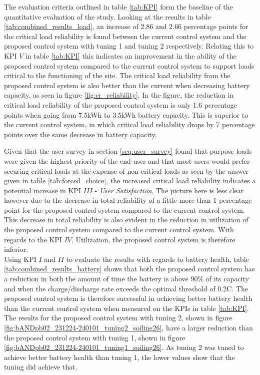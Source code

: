 The evaluation criteria outlined in table \ref{tab:KPI} form the baseline of the quantitative evaluation of the study. Looking at the results in table \ref{tab:combined_results_load}, an increase of 2.86  and 2.66 percentage points for the critical load reliability is found between the current control system and the proposed control system with tuning 1 and tuning 2 respectively. Relating this to KPI $V$ in table \ref{tab:KPI} this indicates an improvement in the ability of the proposed control system compared to the current control system to support loads critical to the functioning of the site. The critical load reliability from the proposed control system is also better than the current when decreasing battery capacity, as seen in figure \ref{fig:cr_reliability}. In the figure, the reduction in critical load reliability of the proposed control system is only 1.6 percentage points when going from 7.5kWh to 3.5kWh battery capacity. This is superior to the current control system, in which critical load reliability drops by 7 percentage points over the same decrease in battery capacity.  

Given that the user survey in section \ref{seq:user_survey} found that purpose loads were given the highest priority of the end-user and that most users would prefer securing critical loads at the expense of non-critical loads as seen by the answer given in table \ref{tab:forced_choice}, the increased critical load reliability indicates a potential increase in KPI $III$ - \textit{User Satisfaction}. The picture here is less clear however due to the decrease in total reliability of a little more than 1 percentage point for the proposed control system compared to the current control system. This decrease in total reliability is also evident in the reduction in utilization of the proposed control system compared to the current control system. With regards to the KPI $IV$, Utilization, the proposed control system is therefore inferior.\\

Using KPI $I$ and $II$ to evaluate the results with regards to battery health, table \ref{tab:combined_results_battery} shows that both the proposed control system has a reduction in both the amount of time the battery is above 90$\%$ of its capacity and when the charge/discharge rate exceeds the optimal threshold of 0.2C. The proposed control system is therefore successful in achieving better battery health than the current control system when measured on the KPIs in table \ref{tab:KPI}. The results for the proposed control system with tuning 2, shown in figure \ref{fig:bANDpb02_231224-240101_tuning2_soiling26}, have a larger reduction than the proposed control system with tuning 1, shown in figure \ref{fig:bANDpb02_231224-240101_tuning1_soiling26}. As tuning 2 was tuned to achieve better battery health than tuning 1, the lower values show that the tuning did achieve that.\\

